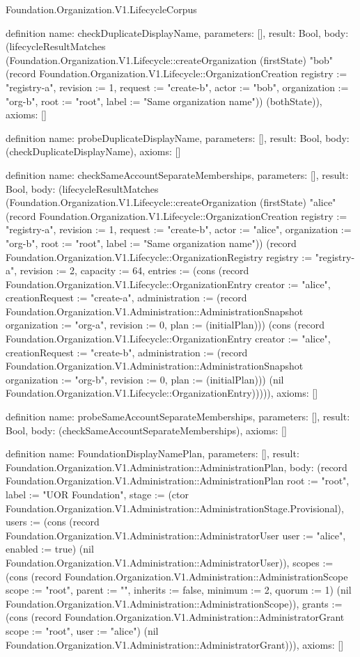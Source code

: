 \begin{lexlean}{Foundation.Organization.V1.LifecycleCorpus}
\begin{semanticmodule}
definition{
  name: checkDuplicateDisplayName,
  parameters: [],
  result: Bool,
  body: (lifecycleResultMatches (Foundation.Organization.V1.Lifecycle::createOrganization (firstState) "bob" (record Foundation.Organization.V1.Lifecycle::OrganizationCreation {registry := "registry-a", revision := 1, request := "create-b", actor := "bob", organization := "org-b", root := "root", label := "Same organization name"})) (bothState)),
  axioms: []
}

definition{
  name: probeDuplicateDisplayName,
  parameters: [],
  result: Bool,
  body: (checkDuplicateDisplayName),
  axioms: []
}

definition{
  name: checkSameAccountSeparateMemberships,
  parameters: [],
  result: Bool,
  body: (lifecycleResultMatches (Foundation.Organization.V1.Lifecycle::createOrganization (firstState) "alice" (record Foundation.Organization.V1.Lifecycle::OrganizationCreation {registry := "registry-a", revision := 1, request := "create-b", actor := "alice", organization := "org-b", root := "root", label := "Same organization name"})) (record Foundation.Organization.V1.Lifecycle::OrganizationRegistry {registry := "registry-a", revision := 2, capacity := 64, entries := (cons (record Foundation.Organization.V1.Lifecycle::OrganizationEntry {creator := "alice", creationRequest := "create-a", administration := (record Foundation.Organization.V1.Administration::AdministrationSnapshot {organization := "org-a", revision := 0, plan := (initialPlan)})}) (cons (record Foundation.Organization.V1.Lifecycle::OrganizationEntry {creator := "alice", creationRequest := "create-b", administration := (record Foundation.Organization.V1.Administration::AdministrationSnapshot {organization := "org-b", revision := 0, plan := (initialPlan)})}) (nil Foundation.Organization.V1.Lifecycle::OrganizationEntry)))})),
  axioms: []
}

definition{
  name: probeSameAccountSeparateMemberships,
  parameters: [],
  result: Bool,
  body: (checkSameAccountSeparateMemberships),
  axioms: []
}

definition{
  name: FoundationDisplayNamePlan,
  parameters: [],
  result: Foundation.Organization.V1.Administration::AdministrationPlan,
  body: (record Foundation.Organization.V1.Administration::AdministrationPlan {root := "root", label := "UOR Foundation", stage := (ctor Foundation.Organization.V1.Administration::AdministrationStage.Provisional), users := (cons (record Foundation.Organization.V1.Administration::AdministratorUser {user := "alice", enabled := true}) (nil Foundation.Organization.V1.Administration::AdministratorUser)), scopes := (cons (record Foundation.Organization.V1.Administration::AdministrationScope {scope := "root", parent := "", inherits := false, minimum := 2, quorum := 1}) (nil Foundation.Organization.V1.Administration::AdministrationScope)), grants := (cons (record Foundation.Organization.V1.Administration::AdministratorGrant {scope := "root", user := "alice"}) (nil Foundation.Organization.V1.Administration::AdministratorGrant))}),
  axioms: []
}


\end{semanticmodule}
\end{lexlean}
